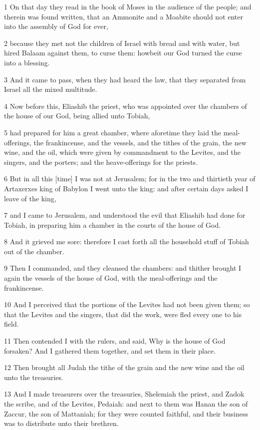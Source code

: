 \par 1 On that day they read in the book of Moses in the audience of the people; and therein was found written, that an Ammonite and a Moabite should not enter into the assembly of God for ever,
\par 2 because they met not the children of Israel with bread and with water, but hired Balaam against them, to curse them: howbeit our God turned the curse into a blessing.
\par 3 And it came to pass, when they had heard the law, that they separated from Israel all the mixed multitude.
\par 4 Now before this, Eliashib the priest, who was appointed over the chambers of the house of our God, being allied unto Tobiah,
\par 5 had prepared for him a great chamber, where aforetime they laid the meal-offerings, the frankincense, and the vessels, and the tithes of the grain, the new wine, and the oil, which were given by commandment to the Levites, and the singers, and the porters; and the heave-offerings for the priests.
\par 6 But in all this [time] I was not at Jerusalem; for in the two and thirtieth year of Artaxerxes king of Babylon I went unto the king: and after certain days asked I leave of the king,
\par 7 and I came to Jerusalem, and understood the evil that Eliashib had done for Tobiah, in preparing him a chamber in the courts of the house of God.
\par 8 And it grieved me sore: therefore I cast forth all the household stuff of Tobiah out of the chamber.
\par 9 Then I commanded, and they cleansed the chambers: and thither brought I again the vessels of the house of God, with the meal-offerings and the frankincense.
\par 10 And I perceived that the portions of the Levites had not been given them; so that the Levites and the singers, that did the work, were fled every one to his field.
\par 11 Then contended I with the rulers, and said, Why is the house of God forsaken? And I gathered them together, and set them in their place.
\par 12 Then brought all Judah the tithe of the grain and the new wine and the oil unto the treasuries.
\par 13 And I made treasurers over the treasuries, Shelemiah the priest, and Zadok the scribe, and of the Levites, Pedaiah: and next to them was Hanan the son of Zaccur, the son of Mattaniah; for they were counted faithful, and their business was to distribute unto their brethren.

